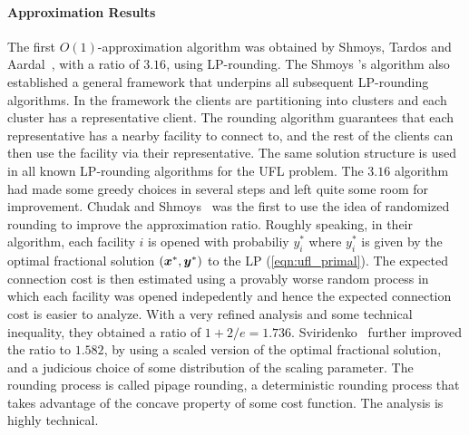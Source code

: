 \documentclass[oneside,final]{ucr}
\begin{document}
\paragraph{Approximation Results}
The first $O(1)$-approximation algorithm was obtained by
Shmoys, Tardos and Aardal~\cite{ShmoysTA97}, with a ratio of
$3.16$, using LP-rounding. The Shmoys {\etal}'s algorithm
also established a general framework that underpins all
subsequent LP-rounding algorithms. In the framework the
clients are partitioning into clusters and each cluster has
a representative client. The rounding algorithm guarantees
that each representative has a nearby facility to connect
to, and the rest of the clients can then use the facility
via their representative. The same solution structure is
used in all known LP-rounding algorithms for the UFL
problem. The $3.16$ algorithm had made some greedy choices
in several steps and left quite some room for
improvement. Chudak and Shmoys~\cite{ChudakS04} was the
first to use the idea of randomized rounding to improve the
approximation ratio. Roughly speaking, in their algorithm,
each facility $i$ is opened with probabiliy $y_i^\ast$ where
$y_i^\ast$ is given by the optimal fractional solution
$(\boldsymbol{x}^\ast,\boldsymbol{y}^\ast)$ to the LP
(\ref{eqn:ufl_primal}). The expected connection cost is then
estimated using a provably worse random process in which
each facility was opened indepedently and hence the expected
connection cost is easier to analyze. With a very refined
analysis and some technical inequality, they obtained a
ratio of $1+2/e = 1.736$. Sviridenko~\cite{Svi02} further
improved the ratio to $1.582$, by using a scaled version of
the optimal fractional solution, and a judicious choice of
some distribution of the scaling parameter. The rounding
process is called pipage rounding, a deterministic rounding
process that takes advantage of the concave property of some
cost function. The analysis is highly technical.
\end{document}
